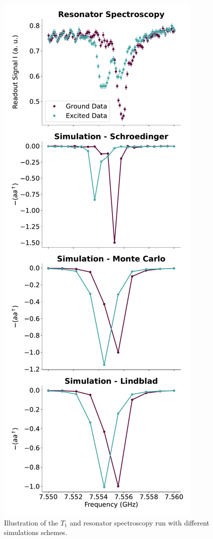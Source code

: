 \begin{figure}[h]
\begin{minipage}{0.45\textwidth}
    \end{minipage}
        \begin{minipage}{0.45\textwidth}
        \centering
        \includegraphics[]{Simulations/simulations_of_calibrations/Figs/resonator_spectroscopy.pdf}
    \end{minipage}
    \caption{Illustration of the $T_1$ and resonator spectroscopy run with different simulations schemes.}
    \label{fig:calibrations_in_simulation}
\end{figure}



